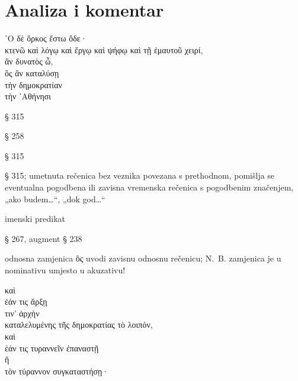 \section*{Analiza i komentar}


{\large
\begin{greek}
\noindent ῾Ο δὲ ὅρκος ἔστω ὅδε·  \\
\tabto{2em} κτενῶ καὶ λόγῳ καὶ ἔργῳ καὶ ψήφῳ καὶ τῇ ἐμαυτοῦ χειρί, \\
\tabto{4em} ἂν δυνατὸς ὦ, \\
\tabto{2em} ὃς ἂν καταλύσῃ \\
\tabto{4em} τὴν δημοκρατίαν \\
\tabto{6em} τὴν ᾿Αθήνησι\\

\end{greek}
}

\begin{description}[noitemsep]
\item[ἔστω] § 315
\item[κτενῶ] § 258
\item[ὦ] § 315
\item[ἂν δυνατὸς ὦ] § 315; umetnuta rečenica bez veznika povezana s prethodnom, pomišlja se eventualna pogodbena ili zavisna vremenska rečenica s pogodbenim značenjem, „ako budem…“, „dok god…“
\item[δυνατὸς ὦ] imenski predikat
\item[καταλύσῃ] § 267, augment § 238
\item[ὃς ἂν καταλύσῃ] odnosna zamjenica ὃς uvodi zavisnu odnosnu rečenicu; N.~B. zamjenica je u nominativu umjesto u akuzativu!

\end{description}

{\large
\begin{greek}
\noindent καὶ \\
\tabto{2em} ἐάν τις ἄρξῃ \\
\tabto{4em} τιν' ἀρχὴν \\
\tabto{2em} καταλελυμένης τῆς δημοκρατίας τὸ λοιπόν,\\
καὶ \\
\tabto{2em} ἐάν τις τυραννεῖν ἐπαναστῇ \\
\tabto{2em} ἢ \\
\tabto{2em} τὸν τύραννον συγκαταστήσῃ·\\

\end{greek}
}

